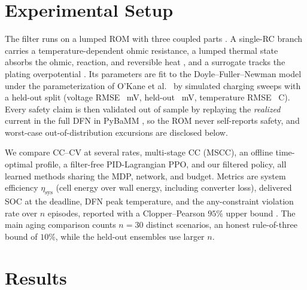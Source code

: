 \documentclass[conference]{IEEEtran}
\newcommand{\degC}{\textdegree C}
\begin{document}
\section{Experimental Setup}
The filter runs on a lumped ROM with three coupled parts \cite{newman2004}. A single-RC branch carries
a temperature-dependent ohmic resistance, a lumped thermal state absorbs the ohmic, reaction, and
reversible heat \cite{bernardi1985}, and a surrogate tracks the plating overpotential
\cite{yang2017plating}. Its parameters are fit to the Doyle--Fuller--Newman model
\cite{doyle1993,fuller1994} under the parameterization of O'Kane et al.\ \cite{okane2022} by simulated charging
sweeps with a held-out split (voltage RMSE
\VRMSE~mV, held-out \VRMSEho~mV, temperature RMSE \TRMSE~\degC).
Every
safety claim is then validated out of sample by replaying the \emph{realized} current in the full DFN
in PyBaMM \cite{sulzer2021pybamm}, so the ROM never self-reports safety, and worst-case out-of-distribution excursions are disclosed below.

We compare CC--CV at several rates, multi-stage CC (MSCC), an offline time-optimal profile, a
filter-free PID-Lagrangian PPO, and our filtered policy, all learned methods sharing the MDP,
network, and budget. Metrics are system efficiency $\eta_\mathrm{sys}$ (cell energy over wall energy,
including converter loss), delivered SOC at the deadline, DFN peak temperature, and the
any-constraint violation rate over $n$ episodes, reported with a Clopper--Pearson $95\%$ upper bound
\cite{clopper1934}.
The main aging comparison counts $n{=}30$ distinct scenarios, an honest rule-of-three bound of $10\%$,
while the held-out ensembles use larger $n$.

\section{Results}\label{sec:results}
\end{document}
